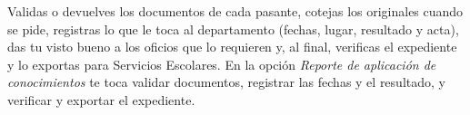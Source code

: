 \documentclass[11pt,a4paper]{article}
\begin{document}
{\small\tableofcontents}
\newpage
\begin{quevasahacer}
Validas o devuelves los documentos de cada pasante, cotejas los originales cuando se pide, registras lo que le toca al departamento (fechas, lugar, resultado y acta), das tu visto bueno a los oficios que lo requieren y, al final, verificas el expediente y lo exportas para Servicios Escolares. En la opción \emph{Reporte de aplicación de conocimientos} te toca validar documentos, registrar las fechas y el resultado, y verificar y exportar el expediente.
\end{quevasahacer}



\end{document}
